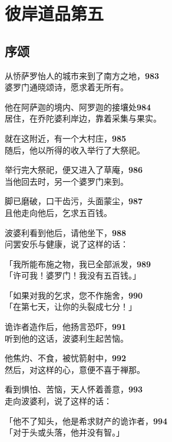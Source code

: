 \chapter{彼岸道品第五}

\section{序颂}


从㤭萨罗怡人的城市来到了南方之地，\hfill{\grayfootnotesize \textbf{983}} \\
婆罗门通晓颂诗，愿求着无所有。


他在阿萨迦的境内、阿罗迦的接壤处\hfill{\grayfootnotesize \textbf{984}} \\
居住，在乔陀婆利岸边，靠着采集与果实。


就在这附近，有一个大村庄，\hfill{\grayfootnotesize \textbf{985}} \\
随后，他以所得的收入举行了大祭祀。


举行完大祭祀，便又进入了草庵，\hfill{\grayfootnotesize \textbf{986}} \\
当他回去时，另一个婆罗门来到。


脚已磨破，口干齿污，头面蒙尘，\hfill{\grayfootnotesize \textbf{987}} \\
且他走向他后，乞求五百钱。


波婆利看到他后，请他坐下，\hfill{\grayfootnotesize \textbf{988}} \\
问罢安乐与健康，说了这样的话：


「我所能布施之物，我已全部派发，\hfill{\grayfootnotesize \textbf{989}} \\
「许可我！婆罗门！我没有五百钱。」


「如果对我的乞求，您不作施舍，\hfill{\grayfootnotesize \textbf{990}} \\
「在第七天，让你的头裂成七分！」

诡诈者造作后，他扬言恐吓，\hfill{\grayfootnotesize \textbf{991}} \\
听到他的这话，波婆利生起苦恼。


他焦灼、不食，被忧箭射中，\hfill{\grayfootnotesize \textbf{992}} \\
然后，对这样的心，意便不喜于禅那。


看到惧怕、苦恼，天人怀着善意，\hfill{\grayfootnotesize \textbf{993}} \\
走向波婆利，说了这样的话：


「他不了知头，他是希求财产的诡诈者，\hfill{\grayfootnotesize \textbf{994}} \\
「对于头或头落，他并没有智。」

